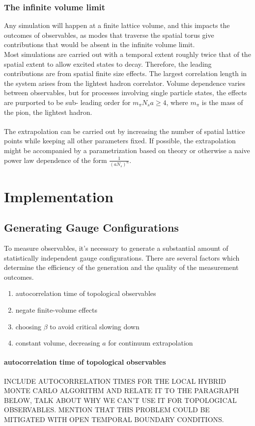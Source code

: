 \documentclass[a4paper,10pt]{article}
\begin{document}
\subsubsection{The infinite volume limit}
Any simulation will happen at a finite lattice volume, and this impacts the outcomes of observables, as modes that traverse the spatial torus give contributions that would be absent in the infinite volume limit.\\Most simulations are carried out with a temporal extent roughly twice that of the spatial extent to allow excited states to decay. Therefore, the leading contributions are from spatial finite size effects. The largest correlation length in the system arises from the lightest hadron correlator. Volume dependence varies between observables, but for processes involving single particle states, the effects are purported to be sub- leading order for $m_\pi N_sa \geq 4$, where $m_\pi$ is the mass of the pion, the lightest hadron.\\\\The extrapolation can be carried out by increasing the number of spatial lattice points while keeping all other parameters fixed. If possible, the extrapolation might be accompanied by a parametrization based on theory or otherwise a naive power law dependence of the form $\frac{1}{(aN_s)^n}$.

\section{Implementation}
\subsection{Generating Gauge Configurations}
To measure observables, it's necessary to generate a substantial amount of statistically independent gauge configurations. There are several factors which determine the efficiency of the generation and the quality of the measurement outcomes.

\begin{enumerate}
\item autocorrelation time of topological observables
\item negate finite-volume effects
\item choosing $\beta$ to avoid critical slowing down
\item constant volume, decreasing $a$ for continuum extrapolation
\end{enumerate}
\paragraph{autocorrelation time of topological observables}
INCLUDE AUTOCORRELATION TIMES FOR THE LOCAL HYBRID MONTE CARLO ALGORITHM AND RELATE IT TO THE PARAGRAPH BELOW, TALK ABOUT WHY WE CAN'T USE IT FOR TOPOLOGICAL OBSERVABLES. MENTION THAT THIS PROBLEM COULD BE MITIGATED WITH OPEN TEMPORAL BOUNDARY CONDITIONS.
\end{document}
